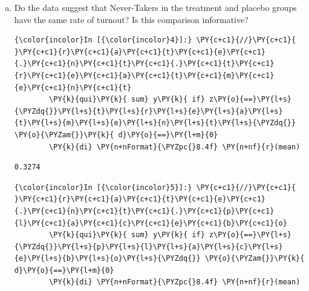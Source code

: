 \documentclass[11pt,notitlepage]{article}\usepackage[]{graphicx}\usepackage[]{color}
\makeatletter
\newenvironment{kframe}{%
 \def\at@end@of@kframe{}%
 \ifinner\ifhmode%
  \def\at@end@of@kframe{\end{minipage}}%
  \begin{minipage}{\columnwidth}%
 \fi\fi%
 \def\FrameCommand##1{\hskip\@totalleftmargin \hskip-\fboxsep
 \colorbox{shadecolor}{##1}\hskip-\fboxsep
     \hskip-\linewidth \hskip-\@totalleftmargin \hskip\columnwidth}%
 \MakeFramed {\advance\hsize-\width
   \@totalleftmargin\z@ \linewidth\hsize
   \@setminipage}}%
 {\par\unskip\endMakeFramed%
 \at@end@of@kframe}
\newenvironment{knitrout}{}{} %
\makeatother
\begin{document}
\begin{enumerate}[a)]
\item Do the data suggest that Never-Takers in the treatment and placebo groups have the same rate of turnout? Is this comparison informative?\\
\begin{knitrout}
\color{fgcolor}\begin{kframe}
   \begin{Verbatim}[commandchars=\\\{\}]
{\color{incolor}In [{\color{incolor}4}]:} \PY{c+c1}{//}\PY{c+c1}{ }\PY{c+c1}{r}\PY{c+c1}{a}\PY{c+c1}{t}\PY{c+c1}{e}\PY{c+c1}{.}\PY{c+c1}{n}\PY{c+c1}{t}\PY{c+c1}{.}\PY{c+c1}{t}\PY{c+c1}{r}\PY{c+c1}{e}\PY{c+c1}{a}\PY{c+c1}{t}\PY{c+c1}{m}\PY{c+c1}{e}\PY{c+c1}{n}\PY{c+c1}{t}
        \PY{k}{qui}\PY{k}{ sum} y\PY{k}{ if} z\PY{o}{==}\PY{l+s}{\PYZdq{}}\PY{l+s}{t}\PY{l+s}{r}\PY{l+s}{e}\PY{l+s}{a}\PY{l+s}{t}\PY{l+s}{m}\PY{l+s}{e}\PY{l+s}{n}\PY{l+s}{t}\PY{l+s}{\PYZdq{}} \PY{o}{\PYZam{}}\PY{k}{ d}\PY{o}{==}\PY{l+m}{0} 
        \PY{k}{di} \PY{n+nFormat}{\PYZpc{}8.4f} \PY{n+nf}{r}(mean)
\end{Verbatim}

    \begin{Verbatim}[commandchars=\\\{\}]
  0.3274
    \end{Verbatim}

    \begin{Verbatim}[commandchars=\\\{\}]
{\color{incolor}In [{\color{incolor}5}]:} \PY{c+c1}{//}\PY{c+c1}{ }\PY{c+c1}{r}\PY{c+c1}{a}\PY{c+c1}{t}\PY{c+c1}{e}\PY{c+c1}{.}\PY{c+c1}{n}\PY{c+c1}{t}\PY{c+c1}{.}\PY{c+c1}{p}\PY{c+c1}{l}\PY{c+c1}{a}\PY{c+c1}{c}\PY{c+c1}{e}\PY{c+c1}{b}\PY{c+c1}{o}
        \PY{k}{qui}\PY{k}{ sum} y\PY{k}{ if} z\PY{o}{==}\PY{l+s}{\PYZdq{}}\PY{l+s}{p}\PY{l+s}{l}\PY{l+s}{a}\PY{l+s}{c}\PY{l+s}{e}\PY{l+s}{b}\PY{l+s}{o}\PY{l+s}{\PYZdq{}} \PY{o}{\PYZam{}}\PY{k}{ d}\PY{o}{==}\PY{l+m}{0}
        \PY{k}{di} \PY{n+nFormat}{\PYZpc{}8.4f} \PY{n+nf}{r}(mean)
\end{Verbatim}


\end{kframe}
\end{knitrout}
\end{enumerate}
\end{document}
